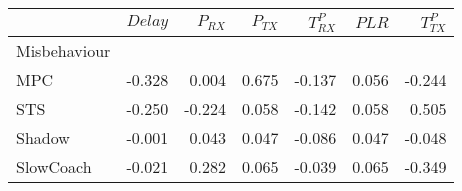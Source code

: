 \begin{tabular}{lrrrrrr}
\toprule
{} &  $Delay$ &  $P_{RX}$ &  $P_{TX}$ &  $T^P_{RX}$ &  $PLR$ &  $T^P_{TX}$ \\
\midrule
Misbehaviour &          &           &           &             &        &             \\
MPC          &   -0.328 &     0.004 &     0.675 &      -0.137 &  0.056 &      -0.244 \\
STS          &   -0.250 &    -0.224 &     0.058 &      -0.142 &  0.058 &       0.505 \\
Shadow       &   -0.001 &     0.043 &     0.047 &      -0.086 &  0.047 &      -0.048 \\
SlowCoach    &   -0.021 &     0.282 &     0.065 &      -0.039 &  0.065 &      -0.349 \\
\bottomrule
\end{tabular}
